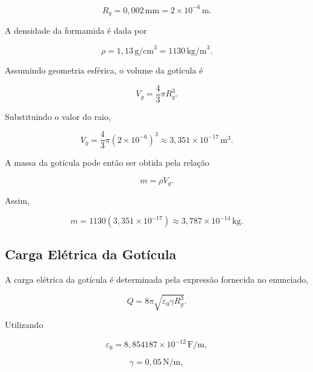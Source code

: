 \documentclass[12pt,a4paper]{article}
\begin{document}
\begin{equation}
R_g = 0{,}002\,\text{mm}
= 2 \times 10^{-6}\,\text{m}.
\end{equation}

A densidade da formamida é dada por

\begin{equation}
\rho = 1{,}13\,\text{g/cm}^3
= 1130\,\text{kg/m}^3.
\end{equation}

Assumindo geometria esférica, o volume da gotícula é

\begin{equation}
V_g
=
\frac{4}{3}\pi R_g^3.
\end{equation}

Substituindo o valor do raio,

\begin{equation}
V_g
=
\frac{4}{3}\pi
\left(2 \times 10^{-6}\right)^3
\approx
3{,}351 \times 10^{-17}\,\text{m}^3.
\end{equation}

A massa da gotícula pode então ser obtida pela relação

\begin{equation}
m = \rho V_g.
\end{equation}

Assim,

\begin{equation}
m
=
1130
\left(
3{,}351 \times 10^{-17}
\right)
\approx
3{,}787 \times 10^{-14}\,\text{kg}.
\end{equation}

\subsection{Carga Elétrica da Gotícula}

A carga elétrica da gotícula é determinada pela expressão fornecida no
enunciado,

\begin{equation}
Q
=
8\pi
\sqrt{
\varepsilon_0 \gamma R_g^3
}.
\end{equation}

Utilizando

\begin{equation}
\varepsilon_0
=
8{,}854187 \times 10^{-12}\,\text{F/m},
\end{equation}

\begin{equation}
\gamma
=
0{,}05\,\text{N/m},
\end{equation}
\end{document}
